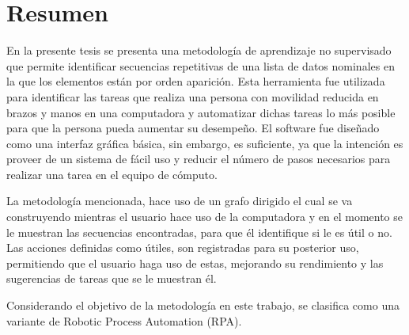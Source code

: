 \chapter{Resumen}
\label{sec:Resumen}

En la presente tesis se presenta una metodolog\'ia de aprendizaje no
 supervisado que permite identificar secuencias repetitivas de una lista de
 datos nominales en la que los elementos est\'an por orden aparici\'on. Esta 
 herramienta fue utilizada para identificar las tareas que realiza una 
 persona con movilidad reducida en brazos y manos en una computadora y 
 automatizar dichas tareas lo m\'as posible para que la persona pueda 
 aumentar su desempe\~no. El software fue dise\~nado como una interfaz 
 gr\'afica b\'asica, sin embargo, es suficiente, ya que la intenci\'on es 
 proveer de un sistema de f\'acil uso y reducir el n\'umero de pasos 
 necesarios para realizar una tarea en el equipo de c\'omputo.


La metodolog\'ia mencionada, hace uso de un grafo dirigido el cual se va 
 construyendo mientras el usuario hace uso de la computadora y en el momento 
 se le muestran las secuencias encontradas, para que \'el identifique si le 
 es \'util o no. Las acciones definidas como \'utiles, son registradas para 
 su posterior uso, permitiendo que el usuario haga uso de estas, mejorando 
 su rendimiento y las sugerencias de tareas que se le muestran \'el.


Considerando el objetivo de la metodolog\'ia en este trabajo, se clasifica 
 como una variante de Robotic Process Automation (RPA).
